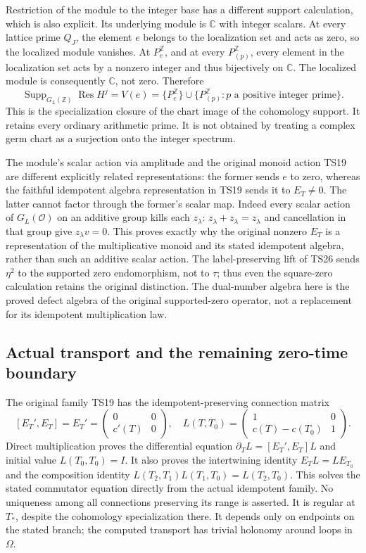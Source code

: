 Restriction of the module to the integer base has a different support
calculation, which is also explicit. Its underlying module is
\(\mathbb C\) with integer scalars. At every lattice prime \(Q_J\),
the element \(e\) belongs to the localization set and acts as zero,
so the localized module vanishes. At \(P_e^{\mathbb Z}\), and at
every \(P_{(p)}^{\mathbb Z}\), every element in the localization
set acts by a nonzero integer and thus bijectively on \(\mathbb C\).
The localized module is consequently \(\mathbb C\), not zero.
Therefore
\[
 \operatorname{Supp}_{G_L(\mathbb Z)}
 \operatorname{Res} H^j
 =V(e)=\{P_e^{\mathbb Z}\}\cup
       \{P_{(p)}^{\mathbb Z}:p\text{ a positive integer prime}\}.
 \tag{TS32a}
\]
This is the specialization closure of the chart image of the
cohomology support. It retains every ordinary arithmetic prime.
It is not obtained by treating a complex germ chart as a surjection
onto the integer spectrum.

The module's scalar action via amplitude and the original monoid
action TS19 are different explicitly related representations: the
former sends \(e\) to zero, whereas the faithful idempotent algebra
representation in TS19 sends it to \(E_T\ne0\). The latter cannot
factor through the former's scalar map. Indeed every scalar action of
\(G_L(\mathcal O)\) on an additive group kills each \(z_\lambda\):
\(z_\lambda+z_\lambda=z_\lambda\) and cancellation in that group
give \(z_\lambda v=0\). This proves exactly why the original nonzero
\(E_T\) is a representation of the multiplicative monoid and its
stated idempotent algebra, rather than such an additive scalar action.
The label-preserving lift of
TS26 sends \(\eta^2\) to the supported zero endomorphism, not to
\(\tau\); thus even the square-zero calculation retains the original
distinction. The dual-number algebra here is the proved defect algebra
of the original supported-zero operator, not a replacement for its
idempotent multiplication law.

\subsection{Actual transport and the remaining zero-time boundary}
The original family TS19 has the idempotent-preserving connection
matrix
\[
 [E_T',E_T]=E_T'=\begin{pmatrix}0&0\\c'(T)&0\end{pmatrix},
 \quad
 L(T,T_0)=\begin{pmatrix}1&0\\c(T)-c(T_0)&1\end{pmatrix}.
 \tag{TS33}
\]
Direct multiplication proves the differential equation
\(\partial_TL=[E_T',E_T]L\) and initial value \(L(T_0,T_0)=I\).
It also proves the intertwining identity \(E_TL=LE_{T_0}\) and
the composition identity \(L(T_2,T_1)L(T_1,T_0)=L(T_2,T_0)\).
This solves the stated commutator equation directly from the actual
idempotent family. No uniqueness among all connections preserving its
range is asserted.
It is regular at \(T_*\), despite the cohomology specialization there.
It depends only on endpoints on the stated branch; the computed
transport has trivial holonomy around loops in \(\Omega\).

